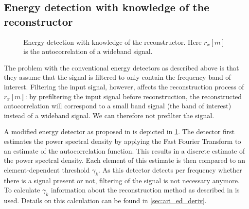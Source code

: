 \documentclass[a4paper, openany, oneside]{memoir}
\begin{document}
\subsection{Energy detection with knowledge of the reconstructor}\label{ssec:ari_ed}
\begin{figure}[H]
\centering
{}
\caption{Energy detection with knowledge of the reconstructor. Here $r_x[m]$ is the autocorrelation of a wideband signal.}\label{tkz:ed_ari_overview}
\end{figure}
The problem with the conventional energy detectors as described above is that they assume that the signal is filtered to only contain the frequency band of interest. Filtering the input signal, however, affects the reconstruction process of $r_x[m]$: by prefiltering the input signal before reconstruction, the reconstructed autocorrelation will correspond to a small band signal (the band of interest) instead of a wideband signal. We can therefore not prefilter the signal.

A modified energy detector as proposed in \cite{ariananda2012compressive} is depicted in \cref{tkz:ed_ari_overview}. The detector first estimates the power spectral density by applying the Fast Fourier Transform to an estimate of the autocorrelation function. This results in a discrete estimate of the power spectral density. Each element of this estimate is then compared to an element-dependent threshold $\gamma_k$. As this detector detects per frequency whether there is a signal present or not, filtering of the signal is not necessary anymore.
To calculate $\gamma_k$ information about the reconstruction method as described in  is used. Details on this calculation can be found in \cref{sec:ari_ed_deriv}.
\end{document}
